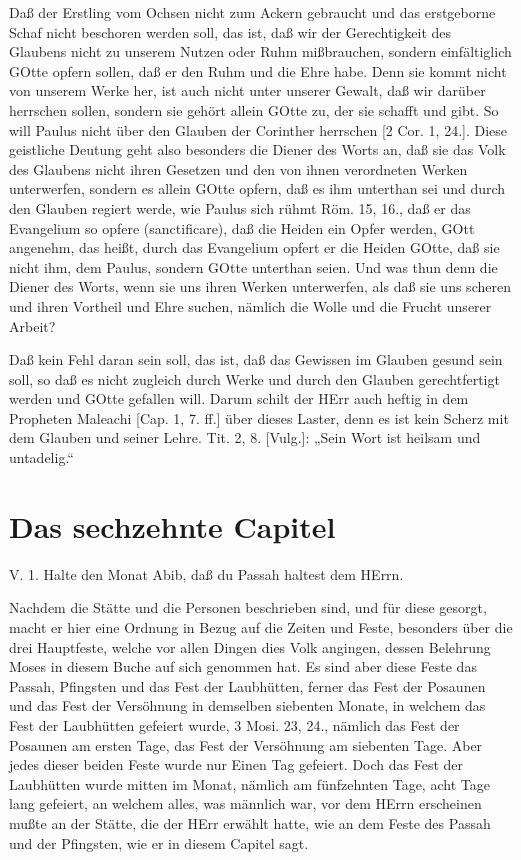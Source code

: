 Daß der Erstling vom Ochsen nicht zum Ackern
gebraucht und das erstgeborne Schaf nicht beschoren werden soll, das ist, daß wir der Gerechtigkeit des Glaubens nicht zu unserem Nutzen oder Ruhm mißbrauchen, sondern einfältiglich GOtte opfern sollen, daß er den Ruhm und die Ehre habe. Denn sie kommt nicht von unserem Werke her, ist auch nicht unter unserer Gewalt, daß wir darüber herrschen sollen, sondern sie gehört allein GOtte zu, der sie schafft und gibt. So will Paulus nicht über den Glauben der Corinther herrschen [2 Cor. 1, 24.]. Diese geistliche Deutung geht also besonders die Diener des Worts an, daß sie das Volk des Glaubens nicht ihren Gesetzen und den von ihnen verordneten Werken unterwerfen, sondern es allein GOtte opfern, daß es ihm unterthan sei und durch den Glauben regiert werde, wie Paulus sich rühmt Röm. 15, 16., daß er das Evangelium so opfere (sanctificare), daß die Heiden ein Opfer werden, GOtt angenehm, das heißt, durch das Evangelium opfert er die Heiden GOtte, daß sie nicht ihm, dem Paulus, sondern GOtte unterthan seien. Und was thun denn die Diener des Worts, wenn sie uns ihren Werken unterwerfen, als daß sie uns scheren und ihren Vortheil und Ehre suchen, nämlich die Wolle und die Frucht unserer Arbeit?

Daß kein Fehl daran sein soll, das ist, daß das Gewissen im Glauben gesund sein soll, so daß es nicht zugleich durch Werke und durch den Glauben gerechtfertigt werden und GOtte gefallen will. Darum schilt der HErr auch heftig in dem Propheten Maleachi [Cap. 1, 7. ff.] über dieses Laster, denn es ist kein Scherz mit dem Glauben und seiner Lehre. Tit. 2, 8. [Vulg.]: „Sein Wort ist heilsam und untadelig.“

\section{Das sechzehnte Capitel}

\begin{schriftzitat}
V. 1. Halte den Monat Abib, daß du Passah haltest dem HErrn.
\end{schriftzitat}

Nachdem die Stätte und die Personen beschrieben sind, und für diese gesorgt, macht er hier eine Ordnung in Bezug auf die Zeiten und Feste, besonders über die drei Hauptfeste, welche vor allen Dingen dies Volk angingen, dessen Belehrung Moses in diesem Buche auf sich genommen hat. Es sind aber diese Feste das Passah, Pfingsten und das Fest der Laubhütten, ferner das Fest der Posaunen und das Fest der Versöhnung in demselben siebenten Monate, in welchem das Fest der Laubhütten gefeiert wurde, 3 Mosi. 23, 24., nämlich das Fest der Posaunen am ersten Tage, das Fest der Versöhnung am siebenten Tage. Aber jedes dieser beiden Feste wurde nur Einen Tag gefeiert. Doch das Fest der Laubhütten wurde mitten im Monat, nämlich am fünfzehnten Tage, acht Tage lang gefeiert, an welchem alles, was männlich war, vor dem HErrn erscheinen mußte an der Stätte, die der HErr erwählt hatte, wie an dem Feste des Passah und der Pfingsten, wie er in diesem Capitel sagt.

